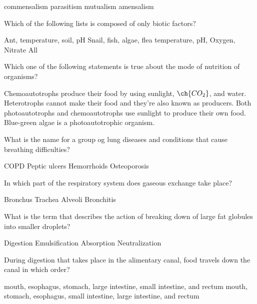 \documentclass[12pt,addpoints]{exam}
\begin{document}
{{{\begin{questions}
					\begin{oneparchoices}
						\choice commensalism
						\choice parasitism
						\choice mutualism
						\choice amensalism
					\end{oneparchoices}
					\question Which of the following lists is composed of only biotic factors?
					\begin{choices}
						\choice Ant, temperature, soil, pH
						\choice Snail, fish, algae, flea
						\choice temperature, pH, Oxygen, Nitrate
						\choice All
					\end{choices}
					\question Which one of the following statements is true about the mode of nutrition of organisms? 
					\begin{choices}
						\choice Chemoautotrophs produce their food by using sunlight, $\ch{CO_2}$, and water.
						\choice Heterotrophs cannot make their food and they're also known as producers.
						\choice Both photoautotrophs and chemoautotrophs use sunlight to produce their own food.
						\choice Blue-green algae is a photoautotrophic organism.
					\end{choices}
					\question What is the name for a group og lung diseases and conditions that cause breathing difficulties? \\
					\begin{oneparchoices}
						\choice COPD
						\choice Peptic ulcers
						\choice Hemorrhoids
						\choice Osteoporosis 
					\end{oneparchoices}
					\question In which part of the respiratory system does gaseous exchange take place? \\
					\begin{oneparchoices}
						\choice Bronchus
						\choice Trachea
						\choice Alveoli
						\choice Bronchitis
					\end{oneparchoices}
					\question What is the term that describes the action of breaking down of large fat globules into smaller droplets? \\
					\begin{oneparchoices}
						\choice Digestion
						\choice Emulsification
						\choice Absorption
						\choice Neutralization
					\end{oneparchoices}
					\question During digestion that takes place in the alimentary canal, food travels down the canal in which order?
					\begin{choices}
						\choice mouth, esophagus, stomach, large intestine, small intestine, and rectum
						\choice mouth, stomach, esophagus, small intestine, large intestine, and rectum

\end{choices}
\end{questions}}}}
\end{document}
